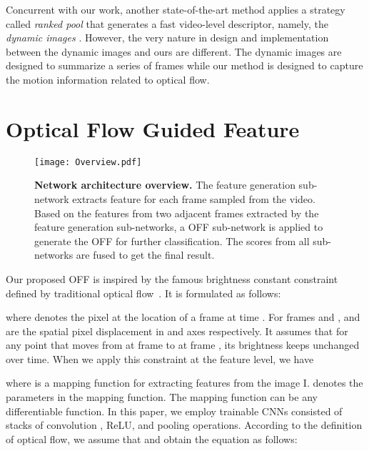 \documentclass[10pt,twocolumn,letterpaper]{article}
\begin{document}
Concurrent with our work, another state-of-the-art method applies a strategy called \textit{ranked pool} \cite{fernando2017rankpool} that generates a fast video-level descriptor, namely, the \textit{dynamic images} \cite{bilen2016dynamic}. However, the very nature in design and implementation between the dynamic images and ours are different. The dynamic images are designed to summarize a series of frames while our method is designed to capture the motion information related to optical flow.

















\section{Optical Flow Guided Feature}

\begin{figure}[t]
\texttt{[image: Overview.pdf]}
\caption{\textbf{Network architecture overview.} The feature generation sub-network extracts feature for each frame sampled from the video. Based on the features from two adjacent frames extracted by the feature generation sub-networks, a OFF sub-network is applied to generate the OFF for further classification. The scores from all sub-networks are fused to get the final result.}
\label{fig:overview_arch}
\end{figure}


\label{sec:method}

Our proposed OFF is inspired by the famous brightness constant constraint defined by traditional optical flow~\cite{HornBertholdK.P.;Schunck1981}. It is formulated as follows:

where  denotes the pixel at the location  of a frame at time . For frames  and ,  and  are the spatial pixel displacement in  and  axes respectively. It assumes that for any point that moves from  at frame  to  at frame , its brightness keeps unchanged over time.  
When we apply this constraint at the feature level, we have

where  is a mapping function for extracting features from the image I.  denotes the parameters in the mapping function. The mapping function  can be any differentiable function. In this paper, we employ trainable CNNs consisted of stacks of convolution , ReLU, and pooling operations. According to the definition of optical flow, we assume that  and obtain the equation as follows:
\end{document}
